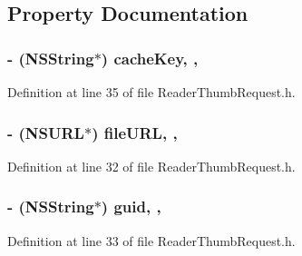 \subsection{Property Documentation}
\hypertarget{interface_reader_thumb_request_ac7a62d4e74ee6a35e068cab853b835ac}{
\subsubsection[{cache\-Key}]{\setlength{\rightskip}{0pt plus 5cm}-\/ (N\-S\-String$\ast$) cache\-Key\hspace{0.3cm}{\ttfamily [read]}, {\ttfamily [nonatomic]}, {\ttfamily [strong]}}}\label{dc/dc5/interface_reader_thumb_request_ac7a62d4e74ee6a35e068cab853b835ac}


Definition at line 35 of file Reader\-Thumb\-Request.\-h.

\hypertarget{interface_reader_thumb_request_aa09c8d6a1a8361f0c9718d7a349abeb9}{
\subsubsection[{file\-U\-R\-L}]{\setlength{\rightskip}{0pt plus 5cm}-\/ (N\-S\-U\-R\-L$\ast$) file\-U\-R\-L\hspace{0.3cm}{\ttfamily [read]}, {\ttfamily [nonatomic]}, {\ttfamily [strong]}}}\label{dc/dc5/interface_reader_thumb_request_aa09c8d6a1a8361f0c9718d7a349abeb9}


Definition at line 32 of file Reader\-Thumb\-Request.\-h.

\hypertarget{interface_reader_thumb_request_a5d8e0e0f2279f1de7554a7740c314626}{
\subsubsection[{guid}]{\setlength{\rightskip}{0pt plus 5cm}-\/ (N\-S\-String$\ast$) guid\hspace{0.3cm}{\ttfamily [read]}, {\ttfamily [nonatomic]}, {\ttfamily [strong]}}}\label{dc/dc5/interface_reader_thumb_request_a5d8e0e0f2279f1de7554a7740c314626}


Definition at line 33 of file Reader\-Thumb\-Request.\-h.

